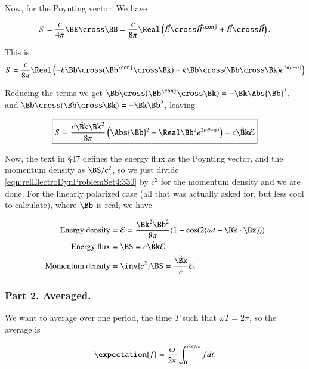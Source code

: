 Now, for the Poynting vector.  We have

\begin{equation}\label{eqn:relElectroDynProblemSet4:310}
S = \frac{c}{4 \pi} \BE \cross \BB = \frac{c}{8 \pi} \Real \left( \vec{E} \cross \vec{B}^\conj + \vec{E} \cross \vec{B} \right).
\end{equation}

This is
\begin{align*}
S 
&= \frac{c}{8 \pi} \Real \left( -k \Bb \cross (\Bb^\conj \cross \Bk) + k \Bb \cross (\Bb \cross \Bk ) e^{2 i(\theta - \alpha)} \right) \\
\end{align*}

Reducing the terms we get $\Bb \cross (\Bb^\conj \cross \Bk) = -\Bk \Abs{\Bb}^2$, and $\Bb \cross (\Bb \cross \Bk) = -\Bk \Bb^2$, leaving

\begin{equation}\label{eqn:relElectroDynProblemSet4:330}
\boxed{
S 
= \frac{c \hat{\Bk} \Bk^2 }{8 \pi} \left( \Abs{\Bb}^2 - \Real \Bb^2 e^{2 i(\theta - \alpha)} \right) = c \hat{\Bk} \mathcal{E}
}
\end{equation}

Now, the text in \S 47 defines the energy flux as the Poynting vector, and the momentum density as $\BS/c^2$, so we just divide \ref{eqn:relElectroDynProblemSet4:330} by $c^2$ for the momentum density and we are done.  For the linearly polarized case (all that was actually asked for, but less cool to calculate), where $\Bb$ is real, we have

\begin{align}\label{eqn:relElectroDynProblemSet4:350}
\mbox{Energy density} &= \mathcal{E} = \frac{ \Bk^2 \Bb^2 }{8\pi} ( 1 - \cos( 2 (\omega t - \Bk \cdot \Bx)) ) \\
\mbox{Energy flux} &= \BS = c \hat{\Bk} \mathcal{E} \\
\mbox{Momentum density} &= \inv{c^2} \BS = \frac{\hat{\Bk}}{c} \mathcal{E}.
\end{align}

\subsubsection{Part 2.  Averaged.}

We want to average over one period, the time $T$ such that $\omega T = 2 \pi$, so the average is

\begin{equation}\label{eqn:relativisticElectrodynamicsL16:360}
\expectation{f} = \frac{\omega}{2\pi} \int_0^{2\pi/\omega} f dt.
\end{equation}

